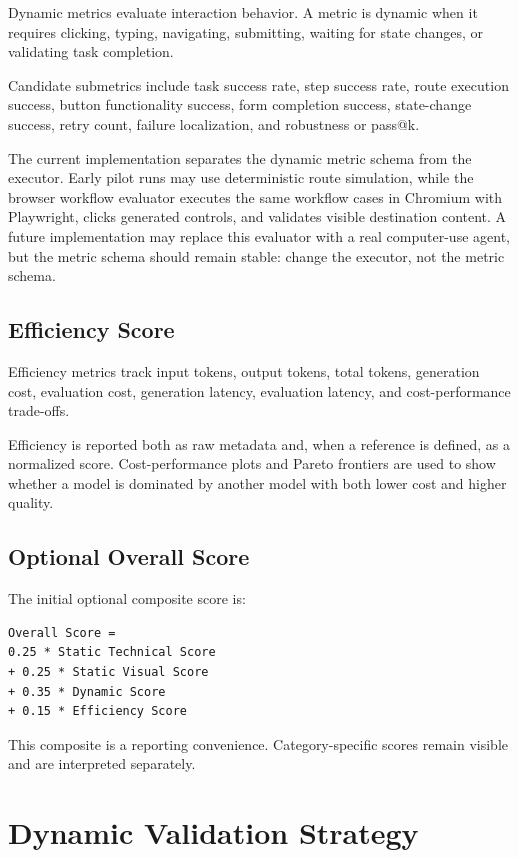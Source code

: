 Dynamic metrics evaluate interaction behavior. A metric is dynamic when it
requires clicking, typing, navigating, submitting, waiting for state changes, or
validating task completion.

Candidate submetrics include task success rate, step success rate, route
execution success, button functionality success, form completion success,
state-change success, retry count, failure localization, and robustness or
pass@k.

The current implementation separates the dynamic metric schema from the
executor. Early pilot runs may use deterministic route simulation, while the
browser workflow evaluator executes the same workflow cases in Chromium with
Playwright, clicks generated controls, and validates visible destination
content. A future implementation may replace this evaluator with a real
computer-use agent, but the metric schema should remain stable: change the
executor, not the metric schema.

\subsection{Efficiency Score}

Efficiency metrics track input tokens, output tokens, total tokens, generation
cost, evaluation cost, generation latency, evaluation latency, and
cost-performance trade-offs.

Efficiency is reported both as raw metadata and, when a reference is defined, as
a normalized score. Cost-performance plots and Pareto frontiers are used to show
whether a model is dominated by another model with both lower cost and higher
quality.

\subsection{Optional Overall Score}

The initial optional composite score is:

\begin{verbatim}
Overall Score =
0.25 * Static Technical Score
+ 0.25 * Static Visual Score
+ 0.35 * Dynamic Score
+ 0.15 * Efficiency Score
\end{verbatim}

This composite is a reporting convenience. Category-specific scores remain
visible and are interpreted separately.

\section{Dynamic Validation Strategy}
\label{sec:dynamic-method}

